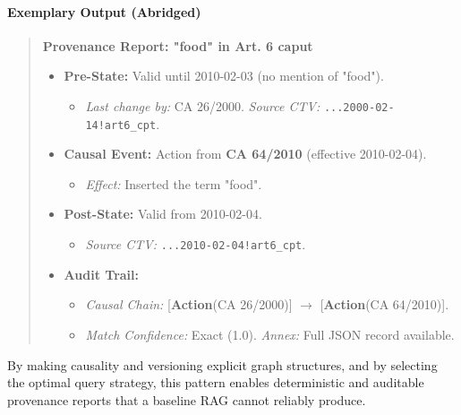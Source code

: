 \documentclass[11pt]{article}
\begin{document}
\paragraph{Exemplary Output (Abridged)}
\begin{quote}
\small
\textbf{Provenance Report: "food" in Art. 6 caput}
\begin{itemize}[leftmargin=*, noitemsep, topsep=0.5em]
    \item \textbf{Pre-State:} Valid until 2010-02-03 (no mention of "food").
        \begin{itemize}[noitemsep]
            \item \textit{Last change by:} CA 26/2000. \textit{Source CTV:} \texttt{...2000-02-14!art6\_cpt}.
        \end{itemize}
    \item \textbf{Causal Event:} Action from \textbf{CA 64/2010} (effective 2010-02-04).
        \begin{itemize}[noitemsep]
            \item \textit{Effect:} Inserted the term "food".
        \end{itemize}
    \item \textbf{Post-State:} Valid from 2010-02-04.
        \begin{itemize}[noitemsep]
            \item \textit{Source CTV:} \texttt{...2010-02-04!art6\_cpt}.
        \end{itemize}
    \item \textbf{Audit Trail:}
        \begin{itemize}[noitemsep]
            \item \textit{Causal Chain:} [\textbf{Action}(CA 26/2000)] \(\rightarrow\) [\textbf{Action}(CA 64/2010)].
            \item \textit{Match Confidence:} Exact (1.0). \textit{Annex:} Full JSON record available.
        \end{itemize}
\end{itemize}
\end{quote}

\noindent By making causality and versioning explicit graph structures, and by selecting the optimal query strategy, this pattern enables deterministic and auditable provenance reports that a baseline RAG cannot reliably produce.
\end{document}
